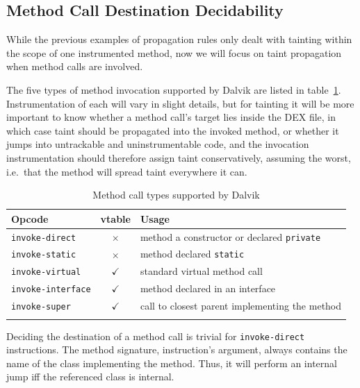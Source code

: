 \documentclass[12pt,twoside,notitlepage]{report}
\newcommand{\tick}{$\checkmark$}
\newcommand{\cross}{$\times$}
\begin{document}
\subsection{Method Call Destination Decidability}
\label{section:TaintPropagation_DestDecision}

While the previous examples of propagation rules only dealt with tainting within the scope of one instrumented method, now we will focus on taint propagation when method calls are involved. 

The five types of method invocation supported by Dalvik are listed in table~\ref{table:TaintPropagation_MethodCallTypes}. Instrumentation of each will vary in slight details, but for tainting it will be more important to know whether a method call's target lies inside the DEX file, in which case taint should be propagated into the invoked method, or whether it jumps into untrackable and uninstrumentable code, and the invocation instrumentation should therefore assign taint conservatively, assuming the worst, i.e.\ that the method will spread taint everywhere it can.

\begin{table}[h]
	\begin{center}
	\begin{tabular}{|l|c|l|}
		\firsthline
		\textbf{Opcode}         & \footnotesize{\textbf{vtable}} & \textbf{Usage} \\
		\hline
		\verb$invoke-direct$    & \cross          & method a constructor or declared \verb$private$ \\
		\verb$invoke-static$    & \cross          & method declared \verb$static$ \\
		\hline
		\verb$invoke-virtual$   & \tick           & standard virtual method call \\
		\verb$invoke-interface$ & \tick           & method declared in an interface \\
		\verb$invoke-super$     & \tick           & call to closest parent implementing the method \\
		\lasthline
	\end{tabular}
	\end{center}
	\caption{Method call types supported by Dalvik}
	\label{table:TaintPropagation_MethodCallTypes}
\end{table}

Deciding the destination of a method call is trivial for \verb$invoke-direct$ instructions. The method signature, instruction's argument, always contains the name of the class implementing the method. Thus, it will perform an internal jump iff the referenced class is internal.
\end{document}
